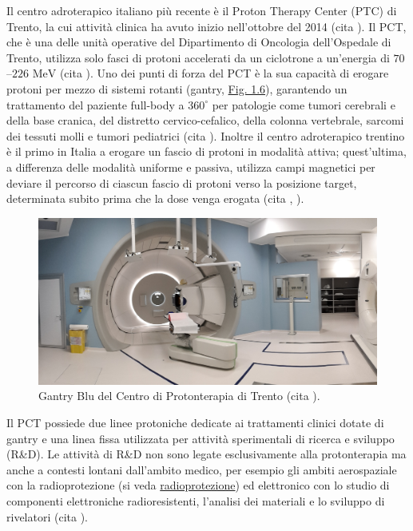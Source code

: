 \documentclass[12pt,a4paper,twoside]{report}
\begin{document}
	Il centro adroterapico italiano più recente è il Proton Therapy Center (PTC) di Trento, la cui attività clinica ha avuto inizio nell'ottobre del 2014 (cita
	). Il PCT, che è una delle unità operative del Dipartimento di Oncologia dell'Ospedale di Trento, utilizza solo fasci di protoni accelerati da un ciclotrone a un'energia di $70$--$226 \mbox{ MeV}$ (cita
	). Uno dei punti di forza del PCT è la sua capacità di erogare protoni per mezzo di sistemi rotanti (gantry, \hyperref[fig:gantry]{Fig. 1.6}), garantendo un trattamento del paziente full-body a $360^\circ$ per patologie come tumori cerebrali e della base cranica, del distretto cervico-cefalico, della colonna vertebrale, sarcomi dei tessuti molli e tumori pediatrici (cita
	). Inoltre il centro adroterapico trentino è il primo in Italia a erogare un fascio di protoni in modalità attiva; quest'ultima, a differenza delle modalità uniforme e passiva, utilizza campi magnetici per deviare il percorso di ciascun fascio di protoni verso la posizione target, determinata subito prima che la dose venga erogata (cita	%
	,
	).
	
	\begin{figure}[H]
		\centering
		\includegraphics[width=0.9\linewidth]{images/gantry.jpg}
		\caption{Gantry Blu del Centro di Protonterapia di Trento (cita
			).}
		\label{fig:gantry}
	\end{figure}
	
	Il PCT possiede due linee protoniche dedicate ai trattamenti clinici dotate di gantry e una linea fissa utilizzata per attività sperimentali di ricerca e sviluppo (R\&D). Le attività di R\&D non sono legate esclusivamente alla protonterapia ma anche a contesti lontani dall'ambito medico, per esempio gli ambiti aerospaziale con la radioprotezione (si veda \hyperref[label]{radioprotezione}) ed elettronico con lo studio di componenti elettroniche radioresistenti, l'analisi dei materiali e lo sviluppo di rivelatori (cita
	). 
	
\end{document}
